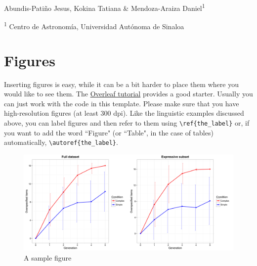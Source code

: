 \vspace{30pt}
\begin{center}
    \LARGE{}
\end{center}

\begin{center}
\vspace{4pt}
\large
    Abundis-Patiño Jesus, Kokina Tatiana \& Mendoza-Araiza Daniel\textsuperscript{1}
    
\small
   \textsuperscript{1} Centro de Astronomía, Universidad Autónoma de Sinaloa

\end{center}





\vspace{10pt}






\section{Figures}

Inserting figures is easy, while it can be a bit harder to place them where you would like to see them. The \href{https://www.overleaf.com/learn/latex/Inserting_Images}{Overleaf tutorial} provides a good starter. Usually you can just work with the code in this template. Please make sure that you have high-resolution figures (at least 300 dpi). Like the linguistic examples discussed above, you can label figures and then refer to them using \verb!\ref{the_label}! or, if you want to add the word ``Figure" (or ``Table", in the case of tables) automatically, \verb!\autoref{the_label}!.


\begin{figure}[H]
    \centering
    \includegraphics[width=\textwidth]{Figures/Figure2.png}
    \caption{A sample figure}
    \label{fig:my_first_figure}
\end{figure}

